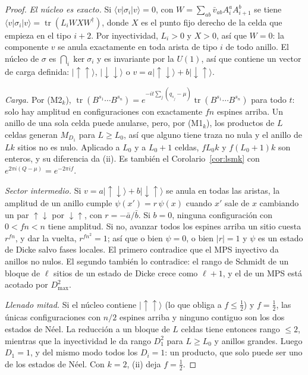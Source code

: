 \documentclass[11pt,a4paper]{article}
\theoremstyle{remark}
\newcommand{\tr}{\operatorname{tr}}
\newcommand{\ket}[1]{|#1\rangle}
\newcommand{\bra}[1]{\langle #1|}
\begin{document}
\begin{proof}
\emph{El núcleo es exacto.} Si $\bra v\sigma_i\ket v=0$, con
$W=\sum_{ab}\bar v_{ab}A_i^aA_{i+1}^b$ se tiene $\bra v\sigma_i\ket v=\tr(L_iWXW^\dagger)$, donde
$X$ es el punto fijo derecho de la celda que empieza en el tipo $i+2$. Por inyectividad, $L_i>0$ y
$X>0$, así que $W=0$: la componente $v$ se anula exactamente en toda arista de tipo $i$ de todo
anillo. El núcleo de $\sigma$ es $\bigcap_i\ker\sigma_i$ y es invariante por la $U(1)$, así que
contiene un vector de carga definida: $\ket{\uparrow\uparrow}$, $\ket{\downarrow\downarrow}$ o
$v=a\ket{\uparrow\downarrow}+b\ket{\downarrow\uparrow}$.

\emph{Carga.} Por (M2$_k$), $\tr(B^{s_1}\cdots B^{s_n})=e^{-it\sum_j(q_{s_j}-\mu)}\tr(B^{s_1}\cdots B^{s_n})$
para todo $t$: solo hay amplitud en configuraciones con exactamente $fn$ espines arriba. Un
anillo de una sola celda puede anularse, pero, por (M1$_k$), los productos de $L$ celdas generan
$M_{D_1}$ para $L\ge L_0$, así que alguno tiene traza no nula y el anillo de $Lk$ sitios no es
nulo. Aplicado a $L_0$ y a $L_0+1$ celdas, $fL_0k$ y $f(L_0+1)k$ son enteros, y su diferencia da (ii). Es también el Corolario~\ref{cor:lsmk}
con $e^{2\pi i(Q-\mu)}=e^{-2\pi if}$.

\emph{Sector intermedio.} Si $v=a\ket{\uparrow\downarrow}+b\ket{\downarrow\uparrow}$ se anula
en todas las aristas, la amplitud de un anillo cumple $\psi(x')=r\,\psi(x)$ cuando $x'$ sale de
$x$ cambiando un par $\uparrow\downarrow$ por $\downarrow\uparrow$, con $r=-\bar a/\bar b$. Si
$b=0$, ninguna configuración con $0<fn<n$ tiene amplitud. Si no, avanzar todos los espines
arriba un sitio cuesta $r^{fn}$, y dar la vuelta, $r^{fn^2}=1$; así que o bien $\psi=0$, o bien
$|r|=1$ y $\psi$ es un estado de Dicke salvo fases locales. El primero contradice que el MPS
inyectivo da anillos no nulos. El segundo también lo contradice: el rango de Schmidt de un
bloque de $\ell$ sitios de un estado de Dicke crece como $\ell+1$, y el de un MPS está acotado por
$D_{\max}^2$.

\emph{Llenado mitad.} Si el núcleo contiene $\ket{\uparrow\uparrow}$ (lo que obliga a $f\le\tfrac12$)
y $f=\tfrac12$, las únicas configuraciones con $n/2$ espines arriba y ninguno contiguo son los dos
estados de Néel. La reducción a un bloque de $L$ celdas tiene entonces rango $\le2$, mientras que
la inyectividad le da rango $D_1^2$ para $L\ge L_0$ y anillos grandes. Luego $D_1=1$, y del mismo
modo todos los $D_i=1$: un producto, que solo puede ser uno de los estados de Néel. Con $k=2$,
(ii) deja $f=\tfrac12$.
\end{proof}
\end{document}
